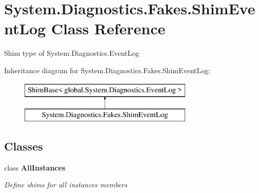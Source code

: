 \hypertarget{class_system_1_1_diagnostics_1_1_fakes_1_1_shim_event_log}{\section{System.\-Diagnostics.\-Fakes.\-Shim\-Event\-Log Class Reference}
\label{class_system_1_1_diagnostics_1_1_fakes_1_1_shim_event_log}
}


Shim type of System.\-Diagnostics.\-Event\-Log 


Inheritance diagram for System.\-Diagnostics.\-Fakes.\-Shim\-Event\-Log\-:\begin{figure}[H]
\begin{center}
\leavevmode
\includegraphics[height=2.000000cm]{class_system_1_1_diagnostics_1_1_fakes_1_1_shim_event_log}
\end{center}
\end{figure}
\subsection*{Classes}
\begin{DoxyCompactItemize}
\item 
class {\bfseries All\-Instances}
\begin{DoxyCompactList}\small\item\em Define shims for all instances members\end{DoxyCompactList}\end{DoxyCompactItemize}
